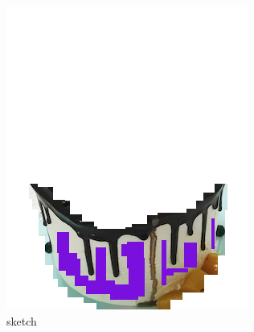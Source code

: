 \documentclass{article}
\begin{document}
\begin{figure}[H]
{\begin{minipage}[t]{0.3\linewidth}
\includegraphics[width=\linewidth]{sketch_13.png}
\caption{sketch}
\end{minipage}%
}%
\end{figure}
\end{document}
